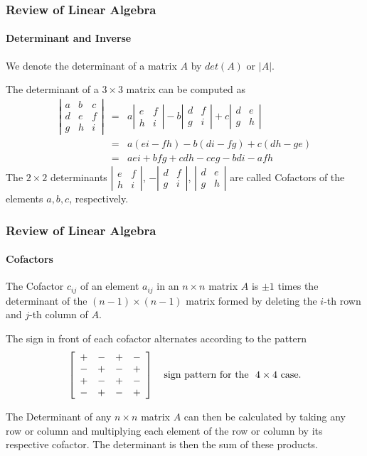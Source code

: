 \begin{frame}
\frametitle{Review of Linear Algebra}
\framesubtitle{Determinant and Inverse}
We denote the determinant of a matrix $A$ by $det(A)$ or $|A|$.

The determinant of a $3\times 3$ matrix can be computed as
\begin{eqnarray*}
\left|\begin{array}{ccc}
a & b & c \\
d & e & f \\
g & h & i
\end{array}\right|
&=& a \left| \begin{array}{cc} e & f \\ h & i \end{array}\right|
-b \left| \begin{array}{cc} d & f \\ g & i \end{array}\right|
+ c \left| \begin{array}{cc} d & e \\ g & h \end{array}\right| \\
&=& a(ei-fh)-b(di-fg)+c(dh-ge) \\
&=& aei +bfg +cdh - ceg - bdi - afh
\end{eqnarray*}
The $2\times 2$ determinants $\left| \begin{array}{cc} e & f \\ h & i \end{array}\right|$,
$-\left| \begin{array}{cc} d & f \\ g & i \end{array}\right|$,
$\left| \begin{array}{cc} d & e \\ g & h \end{array}\right|$
are called {\bor Cofactors} of the elements $a,b,c$, respectively.
\end{frame}
\begin{frame}
\frametitle{Review of Linear Algebra}
\framesubtitle{Cofactors}
\begin{definition}
The {\bor Cofactor} $c_{ij}$ of an element $a_{ij}$ in an $n\times n$ matrix $A$
is $\pm 1$ times
the determinant of the $(n-1)\times (n-1)$ matrix formed by deleting the $i$-th rown and $j$-th column of $A$.

The {\bor sign} in front of each cofactor alternates according to the pattern
$$
\left[\begin{array}{cccc}
+ & - & + & - \\
- & + & - & + \\
+ & - & + & - \\
- & + & - & +
\end{array}\right] \quad \mbox{\rm sign pattern for the }\ 4\times 4 \ \mbox{\rm case.}
$$

The {\bor Determinant} of any $n\times n$ matrix $A$ can then be calculated by taking
{\bor any row} or {\bor column} and multiplying each element of the row or column by its
respective cofactor.  The determinant is then the {\bor sum} of these {\bor products}.
\end{definition}
\end{frame}
